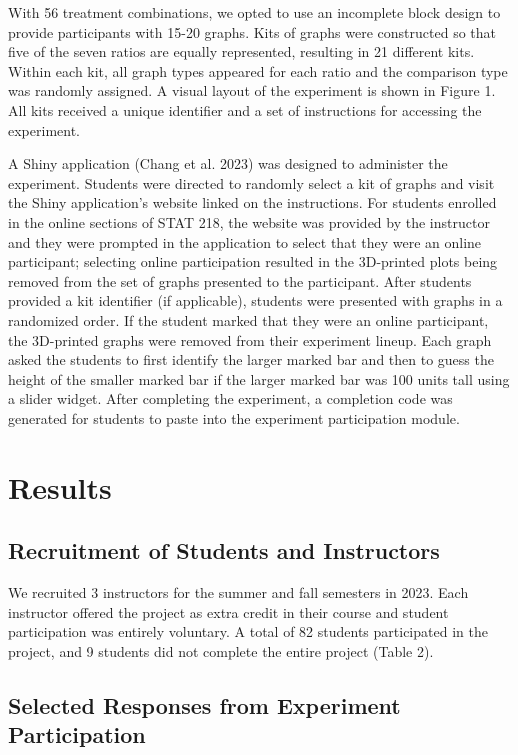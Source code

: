 \documentclass[
  12pt,
]{article}
\begin{document}
With 56 treatment combinations, we opted to use an incomplete block
design to provide participants with 15-20 graphs. Kits of graphs were
constructed so that five of the seven ratios are equally represented,
resulting in 21 different kits. Within each kit, all graph types
appeared for each ratio and the comparison type was randomly assigned. A
visual layout of the experiment is shown in Figure 1. All kits received
a unique identifier and a set of instructions for accessing the
experiment.

A Shiny application (Chang et al. 2023) was designed to administer the
experiment. Students were directed to randomly select a kit of graphs
and visit the Shiny application's website linked on the instructions.
For students enrolled in the online sections of STAT 218, the website
was provided by the instructor and they were prompted in the application
to select that they were an online participant; selecting online
participation resulted in the 3D-printed plots being removed from the
set of graphs presented to the participant. After students provided a
kit identifier (if applicable), students were presented with graphs in a
randomized order. If the student marked that they were an online
participant, the 3D-printed graphs were removed from their experiment
lineup. Each graph asked the students to first identify the larger
marked bar and then to guess the height of the smaller marked bar if the
larger marked bar was 100 units tall using a slider widget. After
completing the experiment, a completion code was generated for students
to paste into the experiment participation module.

\section{Results}\label{results}

\subsection{Recruitment of Students and
Instructors}\label{recruitment-of-students-and-instructors}

We recruited 3 instructors for the summer and fall semesters in 2023.
Each instructor offered the project as extra credit in their course and
student participation was entirely voluntary. A total of 82 students
participated in the project, and 9 students did not complete the entire
project (Table 2).

\subsection{Selected Responses from Experiment
Participation}\label{selected-responses-from-experiment-participation}
\end{document}

